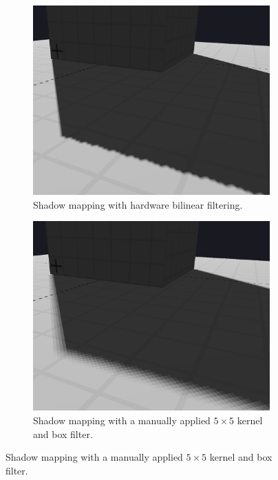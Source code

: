 \begin{figure}
    \centering
    \begin{subfigure}[t]{0.45\textwidth}
        \includegraphics[width=\textwidth]{./graf/PCF_bilinear.png}
        \caption{Shadow mapping with hardware bilinear filtering.}
        \label{fig:pcf_bilinear}
    \end{subfigure}
    \hfill
    \begin{subfigure}[t]{0.45\textwidth}
        \includegraphics[width=\textwidth]{./graf/PCF_manual_kernel_5x5.png}
        \caption{Shadow mapping with a manually applied \(5\times 5\) kernel and box filter.}
        \label{fig:pcf_manual}
    \end{subfigure}


\end{figure}
